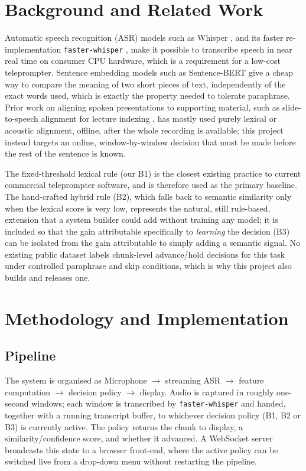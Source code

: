 \documentclass[conference,a4paper]{IEEEtran}
\begin{document}
\section{Background and Related Work}
Automatic speech recognition (ASR) models such as Whisper \cite{b1}, and its faster re-implementation \texttt{faster-whisper} \cite{b6}, make it possible to transcribe speech in near real time on consumer CPU hardware, which is a requirement for a low-cost teleprompter. Sentence embedding models such as Sentence-BERT \cite{b2} give a cheap way to compare the meaning of two short pieces of text, independently of the exact words used, which is exactly the property needed to tolerate paraphrase. Prior work on aligning spoken presentations to supporting material, such as slide-to-speech alignment for lecture indexing \cite{b3}, has mostly used purely lexical or acoustic alignment, offline, after the whole recording is available; this project instead targets an online, window-by-window decision that must be made before the rest of the sentence is known.

The fixed-threshold lexical rule (our B1) is the closest existing practice to current commercial teleprompter software, and is therefore used as the primary baseline. The hand-crafted hybrid rule (B2), which falls back to semantic similarity only when the lexical score is very low, represents the natural, still rule-based, extension that a system builder could add without training any model; it is included so that the gain attributable specifically to \emph{learning} the decision (B3) can be isolated from the gain attributable to simply adding a semantic signal. No existing public dataset labels chunk-level advance/hold decisions for this task under controlled paraphrase and skip conditions, which is why this project also builds and releases one.

\section{Methodology and Implementation}
\subsection{Pipeline}
The system is organised as Microphone $\rightarrow$ streaming ASR $\rightarrow$ feature computation $\rightarrow$ decision policy $\rightarrow$ display. Audio is captured in roughly one-second windows; each window is transcribed by \texttt{faster-whisper} and handed, together with a running transcript buffer, to whichever decision policy (B1, B2 or B3) is currently active. The policy returns the chunk to display, a similarity/confidence score, and whether it advanced. A WebSocket server broadcasts this state to a browser front-end, where the active policy can be switched live from a drop-down menu without restarting the pipeline.
\end{document}
